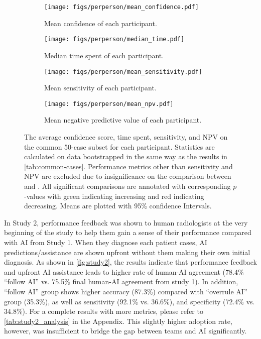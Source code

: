 
\begin{figure}[t]
  \centering
  \begin{subfigure}[b]{0.48\textwidth}
    \centering
    \texttt{[image: figs/perperson/mean\_confidence.pdf]}
    \caption{Mean confidence of each participant.}
  \end{subfigure}
  \begin{subfigure}[b]{0.48\textwidth}
    \centering
    \texttt{[image: figs/perperson/median\_time.pdf]}
    \caption{Median time spent of each participant.}
  \end{subfigure}
  \begin{subfigure}[t]{0.48\textwidth}
    \centering
    \texttt{[image: figs/perperson/mean\_sensitivity.pdf]}
    \caption{Mean sensitivity of each participant.}
  \end{subfigure}
  \begin{subfigure}[t]{0.48\textwidth}
    \centering
    \texttt{[image: figs/perperson/mean\_npv.pdf]}
    \caption{Mean negative predictive value of each participant.}
  \end{subfigure}
  \caption{
  The average confidence score, time spent, sensitivity, and NPV on the common 50-case subset for each participant.
  Statistics are calculated on data bootstrapped in the same way as the results in \cref{tab:common-cases}.
  Performance metrics other than sensitivity and NPV are excluded due to insignificance on the comparison between \halone and \hai[2].
  All significant comparisons are annotated with corresponding $p$-values with green indicating increasing and red indicating decreasing.
  Means are plotted with 95\% confidence Intervals.
  }
\end{figure}
  

In Study 2, performance feedback was shown to human radiologists at the very beginning of the study to help them gain a sense of their performance compared with AI from Study 1. When they diagnose each patient cases, AI predictions/assistance are shown upfront without them making their own initial diagnosis. 
As shown in \cref{fig:study2}, the results indicate that performance feedback and upfront AI assistance leads to higher rate of human-AI agreement (78.4\% ``follow AI'' vs. 75.5\% final human-AI agreement from study 1). 
In addition, ``follow AI'' group shows higher accuracy (87.3\%) compared with ``overrule AI'' group (35.3\%), as well as sensitivity (92.1\% vs. 36.6\%), and specificity (72.4\% vs. 34.8\%). For a complete results with more metrics, please refer to \cref{tab:study2_analysis} in the Appendix.
This slightly higher adoption rate, however, was insufficient to bridge the gap between \hai teams and AI significantly.















